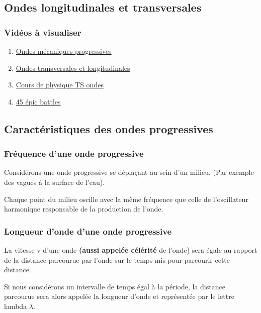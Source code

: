 \subsection{Ondes longitudinales et transversales }

\subsubsection{Vidéos à visualiser}

\begin{enumerate}
 \item \href{https://youtu.be/6eTtMmU9sqM}{Ondes mécaniques progressives}
 \item \href{https://youtu.be/X8wx9n0mgaM}{Ondes transversales et longitudinales}
 \item \href{https://youtu.be/mq9qbbSGgos}{Cours de physique TS ondes}
\item \href{https://youtu.be/cNXP3XnS60s}{45 épic battles}
\end{enumerate}

\subsection{Caractéristiques des ondes progressives}

\subsubsection{Fréquence d'une onde progressive}

Considérons une onde progressive se déplaçant au sein d'un milieu. (Par
exemple des vagues à la surface de l'eau).

Chaque point du milieu oscille avec la même fréquence que celle de
l'oscillateur harmonique responsable de la production de l'onde.

\subsubsection{Longueur d'onde d'une onde progressive }

La vitesse v d'une onde \textbf{(aussi appelée célérité} de l'onde) sera
égale au rapport de la distance parcourue par l'onde sur le temps mis
pour parcourir cette distance.

Si nous considérons un intervalle de temps égal à la période, la
distance parcourue sera alors appelée la longueur d'onde et représentée
par le lettre lambda $\lambda$.

